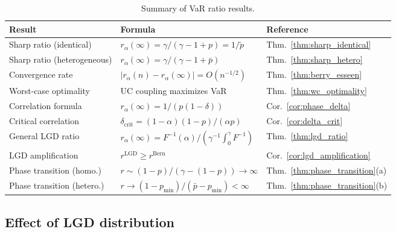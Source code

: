 \documentclass[11pt]{article}
\theoremstyle{definition}
\newcommand{\1}{\mathbf{1}}
\begin{document}
\begin{table}[h]
\centering
\caption{Summary of VaR ratio results.}
\label{tab:summary}
\begin{tabular}{lll}
\toprule
Result & Formula & Reference \\
\midrule
Sharp ratio (identical) & $r_\alpha(\infty) = \gamma/(\gamma-1+p) = 1/\tilde{p}$ & Thm.~\ref{thm:sharp_identical} \\
Sharp ratio (heterogeneous) & $r_\alpha(\infty) = \gamma/(\gamma-1+\bar{p})$ & Thm.~\ref{thm:sharp_hetero} \\
Convergence rate & $|r_\alpha(n) - r_\alpha(\infty)| = O(n^{-1/2})$ & Thm.~\ref{thm:berry_esseen} \\
Worst-case optimality & UC coupling maximizes VaR & Thm.~\ref{thm:wc_optimality} \\
Correlation formula & $r_\alpha(\infty) = 1/(p(1-\delta))$ & Cor.~\ref{cor:phase_delta} \\
Critical correlation & $\delta_{\mathrm{crit}} = (1-\alpha)(1-p)/(\alpha p)$ & Cor.~\ref{cor:delta_crit} \\
General LGD ratio & $r_\alpha(\infty) = F^{-1}(\alpha)/(\gamma^{-1}\!\int_0^\gamma\! F^{-1})$ & Thm.~\ref{thm:lgd_ratio} \\
LGD amplification & $r^{\mathrm{LGD}} \geq r^{\mathrm{Bern}}$ & Cor.~\ref{cor:lgd_amplification} \\
Phase transition (homo.) & $r \sim (1-p)/(\gamma-(1-p)) \to \infty$ & Thm.~\ref{thm:phase_transition}(a) \\
Phase transition (hetero.) & $r \to (1-p_{\min})/(\bar{p}-p_{\min}) < \infty$ & Thm.~\ref{thm:phase_transition}(b) \\
\bottomrule
\end{tabular}
\end{table}

\subsection{Effect of LGD distribution}
\end{document}
